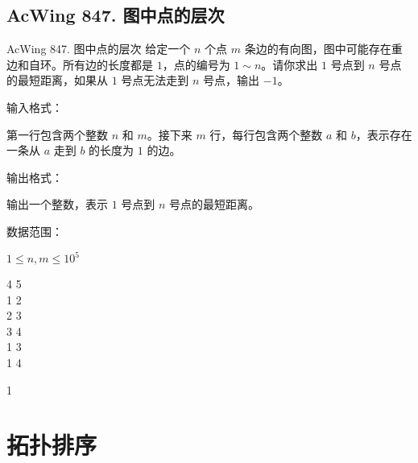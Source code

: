 \subsection{AcWing 847. 图中点的层次}
\begin{titledbox}{AcWing 847. 图中点的层次}
给定一个 $n$ 个点 $m$ 条边的有向图，图中可能存在重边和自环。所有边的长度都是 $1$，点的编号为 $1 \sim n$。请你求出 $1$ 号点到 $n$ 号点的最短距离，如果从 $1$ 号点无法走到 $n$ 号点，输出 $-1$。

输入格式：

第一行包含两个整数 $n$ 和 $m$。接下来 $m$ 行，每行包含两个整数 $a$ 和 $b$，表示存在一条从 $a$ 走到 $b$ 的长度为 $1$ 的边。

输出格式：

输出一个整数，表示 $1$ 号点到 $n$ 号点的最短距离。

数据范围：

$1 \le n,m \le 10^5$

\begin{inputblock}
    4 5 \\
    1 2 \\
    2 3 \\
    3 4 \\
    1 3 \\
    1 4
\end{inputblock}
\begin{outputblock}
    1
\end{outputblock}
\end{titledbox}


\section{拓扑排序}
